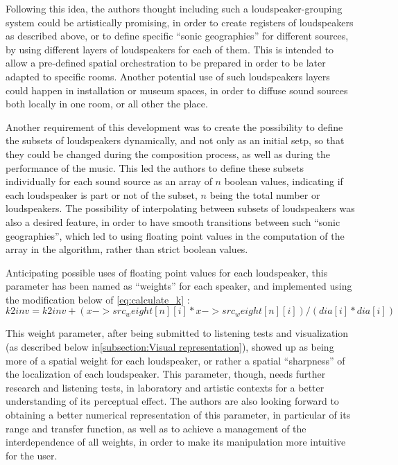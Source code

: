 \documentclass[twoside,10pt]{article}
\begin{document}
Following this idea, the authors thought including such a loudspeaker-grouping system could be artistically promising, in order to create registers of loudspeakers as described above, or to define specific ``sonic geographies'' for different sources, by using different layers of loudspeakers for each of them. This is intended to allow a pre-defined spatial orchestration to be prepared in order to be later adapted to specific rooms\cite{Lyon:2008spatial_orchestration}. Another potential use of such loudspeakers layers could happen in installation or museum spaces, in order to diffuse sound sources both locally in one room, or all other the place.

Another requirement of this development was to create the possibility to define the subsets of loudspeakers dynamically, and not only as an initial setp, so that they could be changed during the composition process, as well as during the performance of the music. This led the authors to define these subsets individually for each sound source as an array of $n$ boolean values, indicating if each loudspeaker is part or not of the subset, $n$ being the total number or loudspeakers.
The possibility of interpolating between subsets of loudspeakers was also a desired feature, in order to have smooth transitions between such ``sonic geographies'', which led to using floating point values in the computation of the array in the algorithm, rather than strict boolean values. 

Anticipating possible uses of floating point values for each loudspeaker, this parameter has been named as ``weights'' for each speaker, and implemented using the modification below of \ref{eq:calculate_k} :
\begin{equation} \label{eq:2Dweight}
k2inv = k2inv + (x->src_weight[n][i]*x->src_weight[n][i])/(dia[i]*dia[i])
\end{equation}

This weight parameter, after being submitted to listening tests and visualization (as described below in\ref{subsection:Visual representation}), showed up as being more of a spatial weight for each loudspeaker, or rather a spatial ``sharpness'' of the localization of each loudspeaker. This parameter, though, needs further research and listening tests, in laboratory and artistic contexts for a better understanding of its perceptual effect.
The authors are also looking forward to obtaining a better numerical representation of this parameter, in particular of its range and transfer function, as well as to achieve a management of the interdependence of all weights, in order to make its manipulation more intuitive for the user.
\end{document}
